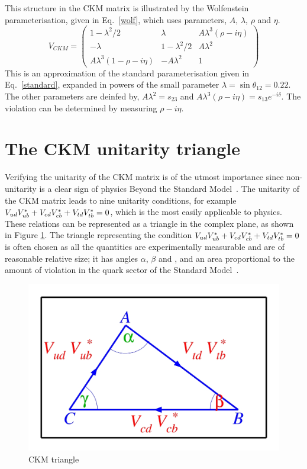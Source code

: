 This structure in the CKM matrix is illustrated by the Wolfenstein parameterisation, given in Eq.~\ref{wolf}, which uses parameters, $A$, $\lambda$, $\rho$ and $\eta$. 
\begin{equation}
V_{CKM} = \begin{pmatrix} 1 - \lambda^2/2 & \lambda & A\lambda^3(\rho - i\eta) \\ 
-\lambda & 1 - \lambda^2/2 & A\lambda^2 \\ 
A\lambda^3(1 - \rho - i\eta) & -A\lambda^2 & 1 \end{pmatrix}
\label{wolf}
\end{equation} 
This is an approximation of the standard parameterisation given in Eq.~\ref{standard}, expanded in powers of the small parameter $\lambda = \sin\theta_{12} = 0.22$. The other parameters are deinfed by, $A\lambda^2 = s_{23}$ and $A\lambda^3(\rho - i\eta) = s_{13}e^{-i\delta}$. The \CP violation can be determined by measuring $\rho - i\eta$.

\section{The CKM unitarity triangle}

Verifying the unitarity of the CKM matrix is of the utmost importance since non-unitarity is a clear sign of physics Beyond the Standard Model~\cite{CKMtriangle}. The unitarity of the CKM matrix leads to nine unitarity conditions, for example ${V_{{u}{d}}}{V_{{u}{b}}^\ast} + {V_{{c}{d}}}{V_{{c}{b}}^\ast} + {V_{{t}{d}}}{V_{{t}{b}}^\ast} = 0$, which is the most easily applicable to \B physics. These relations can be represented as a triangle in the complex plane, as shown in Figure \ref{triangle}. The triangle representing the condition ${V_{{u}{d}}}{V_{{u}{b}}^\ast} + {V_{{c}{d}}}{V_{{c}{b}}^\ast} + {V_{{t}{d}}}{V_{{t}{b}}^\ast} = 0$ is often chosen as all the quantities are experimentally measurable and are of reasonable relative size; it has angles $\alpha$, $\beta$ and \Pgamma, and an area proportional to the amount of \CP violation in the quark sector of the Standard Model~\cite{CKMtriangle}. 
\begin{figure}
\centering
\includegraphics[width=0.4\linewidth]{figures/theory/triangle.pdf}
\caption{CKM triangle}
\label{triangle}
\end{figure}

